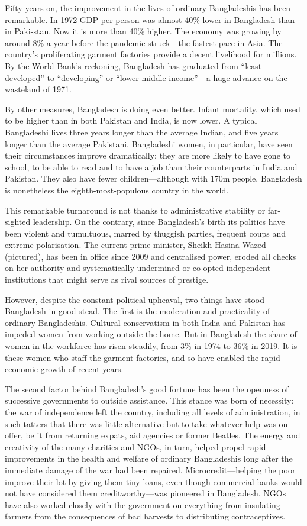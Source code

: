 \documentclass{article}
\begin{document}
Fifty years on, the improvement in the lives of ordinary Bangladeshis has been remarkable. In 1972 GDP per person was almost 40\% lower in \href{/node/21799723}{Bangladesh} than in Paki-stan. Now it is more than 40\% higher. The economy was growing by around 8\% a year before the pandemic struck---the fastest pace in Asia. The country's proliferating garment factories provide a decent livelihood for millions. By the World Bank's reckoning, Bangladesh has graduated from ``least developed'' to ``developing'' or ``lower middle-income''---a huge advance on the wasteland of 1971. 

By other measures, Bangladesh is doing even better. Infant mortality, which used to be higher than in both Pakistan and India, is now lower. A typical Bangladeshi lives three years longer than the average Indian, and five years longer than the average Pakistani. Bangladeshi women, in particular, have seen their circumstances improve dramatically: they are more likely to have gone to school, to be able to read and to have a job than their counterparts in India and Pakistan. They also have fewer children---although with 170m people, Bangladesh is nonetheless the eighth-most-populous country in the world. 

This remarkable turnaround is not thanks to administrative stability or far-sighted leadership. On the contrary, since Bangladesh's birth its politics have been violent and tumultuous, marred by thuggish parties, frequent coups and extreme polarisation. The current prime minister, Sheikh Hasina Wazed (pictured), has been in office since 2009 and centralised power, eroded all checks on her authority and systematically undermined or co-opted independent institutions that might serve as rival sources of prestige. 

However, despite the constant political upheaval, two things have stood Bangladesh in good stead. The first is the moderation and practicality of ordinary Bangladeshis. Cultural conservatism in both India and Pakistan has impeded women from working outside the home. But in Bangladesh the share of women in the workforce has risen steadily, from 3\% in 1974 to 36\% in 2019. It is these women who staff the garment factories, and so have enabled the rapid economic growth of recent years. 

The second factor behind Bangladesh's good fortune has been the openness of successive governments to outside assistance. This stance was born of necessity: the war of independence left the country, including all levels of administration, in such tatters that there was little alternative but to take whatever help was on offer, be it from returning expats, aid agencies or former Beatles. The energy and creativity of the many charities and NGOs, in turn, helped propel rapid improvements in the health and welfare of ordinary Bangladeshis long after the immediate damage of the war had been repaired. Microcredit---helping the poor improve their lot by giving them tiny loans, even though commercial banks would not have considered them creditworthy---was pioneered in Bangladesh. NGOs have also worked closely with the government on everything from insulating farmers from the consequences of bad harvests to distributing contraceptives. 
\end{document}
